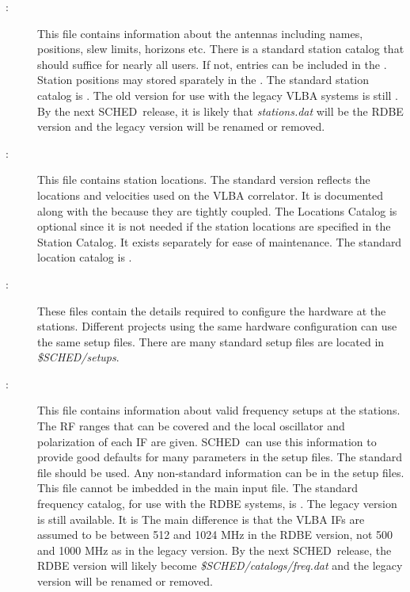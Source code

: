 \documentclass{report}
\newcommand{\schedb}{{\sc SCHED~}}
\begin{document}
\begin{description}
\item[:] This file contains
information about the antennas including names, positions, slew
limits, horizons etc.  There is a standard station catalog that should
suffice for nearly all users.  If not, entries can be included in the
.  Station positions may
stored sparately in the .  The
standard station catalog is . The old
version for use with the legacy VLBA systems is still 
.  By the next
\schedb release, it is likely that {\sl stations.dat} will be the RDBE version
and the legacy version will be renamed or removed.

\item[:] This file contains
station locations.  The standard version reflects the locations and
velocities used on the VLBA correlator.  It is documented along with
the  because they are tightly
coupled.  The Locations Catalog is optional since it is not needed if
the station locations are specified in the Station Catalog.  It exists
separately for ease of maintenance.  The standard
location catalog is .

\item[:] These files contain the
details required to configure the hardware at the stations.  Different
projects using the same hardware configuration can use the same setup
files.  There are many standard setup files are located in
{\sl \$SCHED/setups}.

\item[:] This file contains
information about valid frequency setups at the stations.  The RF
ranges that can be covered and the local oscillator and polarization
of each IF are given.  \schedb can use this information to provide
good defaults for many parameters in the setup files.  The standard
file should be used.  Any non-standard information can be in the setup
files.  This file cannot be imbedded in the main input file.  The standard
frequency catalog, for use with the RDBE systems, is .  The legacy version is
still available.  It is 
The main difference is that the VLBA IFs are assumed to be between 512
and 1024 MHz in the RDBE version, not 500 and 1000 MHz as in the legacy
version.  By the next \schedb release, the RDBE version will likely become
{\sl \$SCHED/catalogs/freq.dat} and the legacy version will be renamed or
removed.


\end{description}
\end{document}
